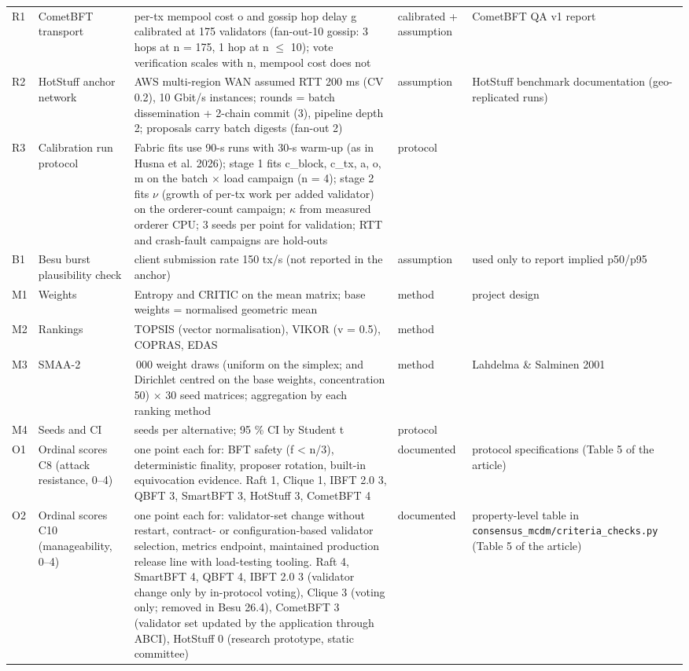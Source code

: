 \documentclass[a4paper,10pt]{article}
\begin{document}
\begin{longtable}{>{\raggedright\arraybackslash}p{0.9cm} >{\raggedright\arraybackslash}p{3.2cm} >{\raggedright\arraybackslash}p{8.6cm} >{\raggedright\arraybackslash}p{2.6cm} >{\raggedright\arraybackslash}p{7.2cm}}
R1 & CometBFT transport & per-tx mempool cost o and gossip hop delay g calibrated at 175 validators (fan-out-10 gossip: 3 hops at n = 175, 1 hop at n $\leq$ 10); vote verification scales with n, mempool cost does not & calibrated + assumption & CometBFT QA v1 report\\
R2 & HotStuff anchor network & AWS multi-region WAN assumed RTT 200 ms (CV 0.2), 10 Gbit/s instances; rounds = batch dissemination + 2-chain commit (3), pipeline depth 2; proposals carry batch digests (fan-out 2) & assumption & HotStuff benchmark documentation (geo-replicated runs)\\
R3 & Calibration run protocol & Fabric fits use 90-s runs with 30-s warm-up (as in Husna et al. 2026); stage 1 fits c\_block, c\_tx, a, o, m on the batch $\times$ load campaign (n = 4); stage 2 fits $\nu$ (growth of per-tx work per added validator) on the orderer-count campaign; $\kappa$ from measured orderer CPU; 3 seeds per point for validation; RTT and crash-fault campaigns are hold-outs & protocol & \\
B1 & Besu burst plausibility check & client submission rate 150 tx/s (not reported in the anchor) & assumption & used only to report implied p50/p95\\
M1 & Weights & Entropy and CRITIC on the mean matrix; base weights = normalised geometric mean & method & project design\\
M2 & Rankings & TOPSIS (vector normalisation), VIKOR (v = 0.5), COPRAS, EDAS & method & \\
M3 & SMAA-2 & 10\,000 weight draws (uniform on the simplex; and Dirichlet centred on the base weights, concentration 50) $\times$ 30 seed matrices; aggregation by each ranking method & method & Lahdelma \& Salminen 2001\\
M4 & Seeds and CI & 30 seeds per alternative; 95 \% CI by Student t & protocol & \\
O1 & Ordinal scores C8 (attack resistance, 0--4) & one point each for: BFT safety (f < n/3), deterministic finality, proposer rotation, built-in equivocation evidence. Raft 1, Clique 1, IBFT 2.0 3, QBFT 3, SmartBFT 3, HotStuff 3, CometBFT 4 & documented & protocol specifications (Table 5 of the article)\\
O2 & Ordinal scores C10 (manageability, 0--4) & one point each for: validator-set change without restart, contract- or configuration-based validator selection, metrics endpoint, maintained production release line with load-testing tooling. Raft 4, SmartBFT 4, QBFT 4, IBFT 2.0 3 (validator change only by in-protocol voting), Clique 3 (voting only; removed in Besu 26.4), CometBFT 3 (validator set updated by the application through ABCI), HotStuff 0 (research prototype, static committee) & documented & property-level table in \texttt{consensus\_mcdm/criteria\_checks.py} (Table 5 of the article)\\

\end{longtable}
\end{document}
